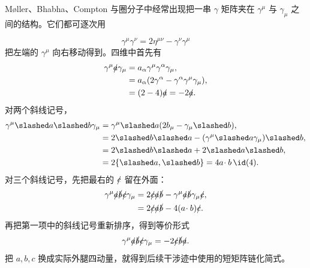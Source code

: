 \begin{derivation}
M\o ller、Bhabha、Compton 与圈分子中经常出现把一串 $\gamma$ 矩阵夹在 $\gamma^\mu$ 与 $\gamma_\mu$ 之间的结构。它们都可逐次用

\begin{equation*}
 \gamma^\mu\gamma^\nu=2\eta^{\mu\nu}-\gamma^\nu\gamma^\mu
 \end{equation*}
把左端的 $\gamma^\mu$ 向右移动得到。四维中首先有
\begin{align*}
 \gamma^\mu\slashed a\gamma_\mu
 &=a_\alpha\gamma^\mu\gamma^\alpha\gamma_\mu,\\
 &=a_\alpha(2\gamma^\alpha-\gamma^\alpha\gamma^\mu\gamma_\mu),\\
 &=(2-4)\slashed a=-2\slashed a.
 \end{align*}
对两个斜线记号，
\begin{align*}
 \gamma^\mu\slashed a\slashed b\gamma_\mu
 &=\gamma^\mu\slashed a(2b_\mu-\gamma_\mu\slashed b),\\
 &=2\slashed b\slashed a-
 (\gamma^\mu\slashed a\gamma_\mu)\slashed b,\\
 &=2\slashed b\slashed a+2\slashed a\slashed b,\\
 &=2\{\slashed a,\slashed b\}=4a\!\cdot b\,\id(4).
 \end{align*}
对三个斜线记号，先把最右的 $\slashed c$ 留在外面：
\begin{align*}
 \gamma^\mu\slashed a\slashed b\slashed c\gamma_\mu
 &=2\slashed c\slashed a\slashed b
 -\gamma^\mu\slashed a\slashed b\gamma_\mu\slashed c,\\
 &=2\slashed c\slashed a\slashed b-4(a\!\cdot b)\slashed c.
\end{align*}
再把第一项中的斜线记号重新排序，得到等价形式
\begin{equation*}
 {
 \gamma^\mu\slashed a\slashed b\slashed c\gamma_\mu
 =-2\slashed c\slashed b\slashed a.}
 \end{equation*}
把 $a,b,c$ 换成实际外腿四动量，就得到后续干涉迹中使用的短矩阵链化简式。
\end{derivation}

